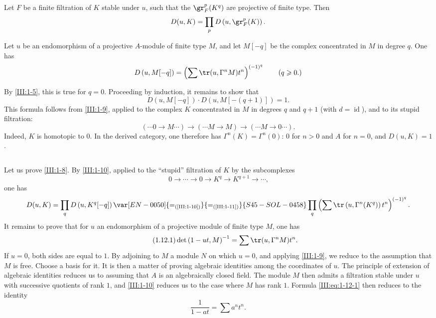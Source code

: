 \begin{lemma_}\label{III:1-10}
Let $F$ be a finite filtration of $K$ stable under $u$, such that the
$\gr_F^p(K^q)$ are projective of finite type. Then
\[
  D(u,K) = \prod_p D\left(u,\gr_F^p(K)\right) \text{.}
\]
\end{lemma_}






\begin{lemma_}\label{III:1-11}
Let $u$ be an endomorphism of a projective $A$-module of finite type $M$, and
let $M[-q]$ be the complex concentrated in $M$ in degree $q$. One has
\[
  D\left(u,M[-q]\right) = \left(\sum \tr(u,\Gamma^n M) t^n\right)^{(-1)^q} \qquad \text{($q\geqslant 0$.)}
\]
\end{lemma_}






By \ref{III:1-5}, this is true for $q=0$. Proceeding by induction, it remains
to show that
\[
  D\left(u,M[-q]\right) \cdot D\left(u,M[-(q+1)]\right) = 1 \text{.}
\]
This formula follows from \ref{III:1-9}, applied to the complex $K$
concentrated in $M$ in degrees $q$ and $q+1$ (with
$d=\operatorname{id}$), and to its stupid filtration:
\[
  (\cdots 0 \to M \cdots) \to (\cdots M \to M) \to (\cdots M \to 0 \cdots) \text{.}
\]
Indeed, $K$ is homotopic to $0$. In the derived category, one therefore has
$\Gamma^n(K)=\Gamma^n(0)$: $0$ for $n>0$ and $A$ for $n=0$, and $D(u,K)=1$.





\subsection{}\label{III:1-12}

Let us prove \ref{III:1-8}. By \ref{III:1-10}, applied to the ``stupid''
filtration of $K$ by the subcomplexes
\[
  0 \to \cdots \to 0 \to K^q \to K^{q+1} \to \cdots \text{,}
\]
one has
\[
  D(u,K) = \prod_q D\left(u,K^q[-q]\right) \var[EN-0050]{=_{\text{(\ref{III:1-10})}}}{=_{\text{(\ref{III:1-11})}}}{S45-SOL-0458} \prod_q \left(\sum \tr\left(u,\Gamma^n(K^q)\right) t^n \right)^{(-1)^q} \text{.}
\]
It remains to prove that for $u$ an endomorphism of a projective module of
finite type $M$, one has
\begin{equation*}\tag{1.12.1}\label{III:eq:1-12-1}
  \det\left(1-u t,M\right)^{-1} = \sum \tr(u,\Gamma^n M) t^n \text{.}
\end{equation*}
If $u=0$, both sides are equal to $1$. By adjoining to $M$ a module $N$ on
which $u=0$, and applying \ref{III:1-9}, we reduce to the assumption that $M$
is free. Choose a basis for it. It is then a matter of proving algebraic
identities among the coordinates of $u$. The principle of extension of
algebraic identities reduces us to assuming that $A$ is an algebraically
closed field. The module $M$ then admits a filtration stable under $u$ with
successive quotients of rank $1$, and \ref{III:1-10} reduces us to the case
where $M$ has rank $1$. Formula \eqref{III:eq:1-12-1} then reduces to the
identity
\[
  \frac{1}{1-a t} = \sum a^n t^n \text{.}
\]





